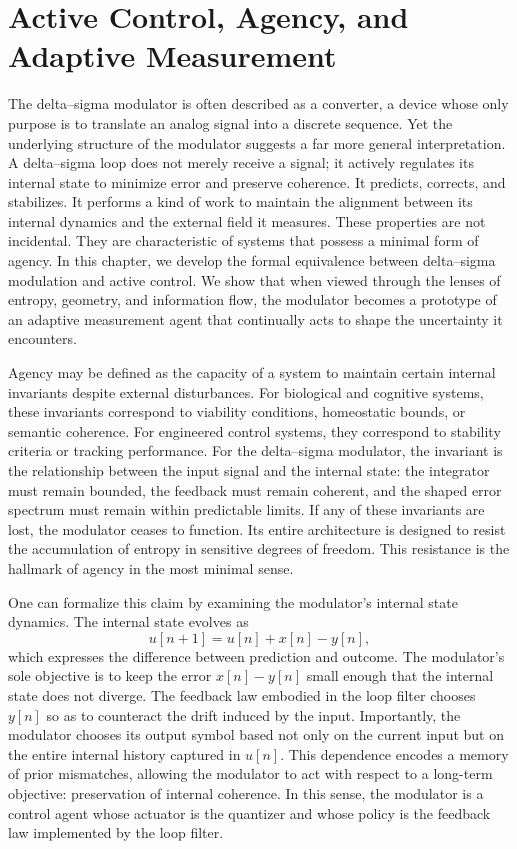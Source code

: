 
\chapter{Active Control, Agency, and Adaptive Measurement}

The delta–sigma modulator is often described as a converter, a device whose only purpose is to translate an analog signal into a discrete sequence. Yet the underlying structure of the modulator suggests a far more general interpretation. A delta–sigma loop does not merely receive a signal; it actively regulates its internal state to minimize error and preserve coherence. It predicts, corrects, and stabilizes. It performs a kind of work to maintain the alignment between its internal dynamics and the external field it measures. These properties are not incidental. They are characteristic of systems that possess a minimal form of agency. In this chapter, we develop the formal equivalence between delta–sigma modulation and active control. We show that when viewed through the lenses of entropy, geometry, and information flow, the modulator becomes a prototype of an adaptive measurement agent that continually acts to shape the uncertainty it encounters.

Agency may be defined as the capacity of a system to maintain certain internal invariants despite external disturbances. For biological and cognitive systems, these invariants correspond to viability conditions, homeostatic bounds, or semantic coherence. For engineered control systems, they correspond to stability criteria or tracking performance. For the delta–sigma modulator, the invariant is the relationship between the input signal and the internal state: the integrator must remain bounded, the feedback must remain coherent, and the shaped error spectrum must remain within predictable limits. If any of these invariants are lost, the modulator ceases to function. Its entire architecture is designed to resist the accumulation of entropy in sensitive degrees of freedom. This resistance is the hallmark of agency in the most minimal sense.

One can formalize this claim by examining the modulator’s internal state dynamics. The internal state evolves as
\[
u[n+1] = u[n] + x[n] - y[n],
\]
which expresses the difference between prediction and outcome. The modulator’s sole objective is to keep the error \(x[n] - y[n]\) small enough that the internal state does not diverge. The feedback law embodied in the loop filter chooses \(y[n]\) so as to counteract the drift induced by the input. Importantly, the modulator chooses its output symbol based not only on the current input but on the entire internal history captured in \(u[n]\). This dependence encodes a memory of prior mismatches, allowing the modulator to act with respect to a long-term objective: preservation of internal coherence. In this sense, the modulator is a control agent whose actuator is the quantizer and whose policy is the feedback law implemented by the loop filter.

